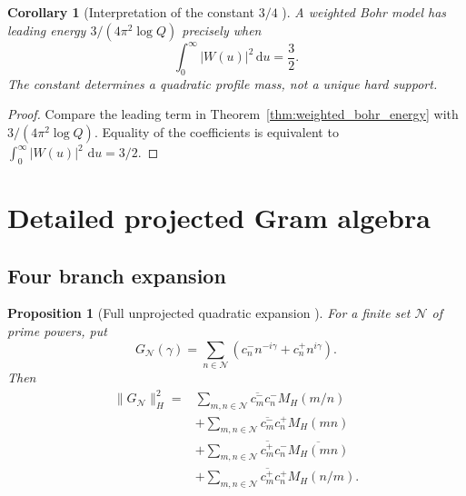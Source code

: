 \documentclass[11pt]{amsart}
\numberwithin{equation}{section}
\theoremstyle{plain}
\newtheorem{proposition}[theorem]{Proposition}
\newtheorem{corollary}[theorem]{Corollary}
\theoremstyle{definition}
\theoremstyle{remark}
\newcommand{\1}{\mathbf{1}}
\newcommand{\dd}{\,\mathrm{d}}
\begin{document}
\begin{corollary}[Interpretation of the constant \(3/4\) {}]
\label{cor:three_quarter_profile_mass}
A weighted Bohr model has leading energy
$3/(4\pi^2\log Q)$ precisely when
\begin{equation}
\int_0^\infty|W(u)|^2\dd u
=
\frac32.
\label{eq:profile_mass_three_half}
\end{equation}
The constant determines a quadratic profile mass, not a unique hard support.
\end{corollary}

\begin{proof}
Compare the leading term in
Theorem~\ref{thm:weighted_bohr_energy} with
\(3/(4\pi^2\log Q)\).  Equality of the coefficients is equivalent to
\(\int_0^\infty|W(u)|^2\,\dd u=3/2\).
\end{proof}

\section{Detailed projected Gram algebra}
\label{sec:detailed_gram_algebra}

\subsection{Four branch expansion}
\label{subsec:four_branch_expansion}


\begin{proposition}[Full unprojected quadratic expansion {}]
\label{prop:full_four_branch_expansion}
For a finite set $\mathcal N$ of prime powers, put
\begin{equation}
G_{\mathcal N}(\gamma)
=
\sum_{n\in\mathcal N}
\left(c_n^-n^{-i\gamma}+c_n^+n^{i\gamma}\right).
\label{eq:G_N_set}
\end{equation}
Then
\begin{align}
\|G_{\mathcal N}\|_H^2
={}&
\sum_{m,n\in\mathcal N}
\overline{c_m^-}c_n^-M_H(m/n)
\label{eq:four_branch_mm}
\\
&+
\sum_{m,n\in\mathcal N}
\overline{c_m^-}c_n^+M_H(mn)
\label{eq:four_branch_mp}
\\
&+
\sum_{m,n\in\mathcal N}
\overline{c_m^+}c_n^-\overline{M_H(mn)}
\label{eq:four_branch_pm}
\\
&+
\sum_{m,n\in\mathcal N}
\overline{c_m^+}c_n^+M_H(n/m).
\label{eq:four_branch_pp}
\end{align}
\end{proposition}
\end{document}
